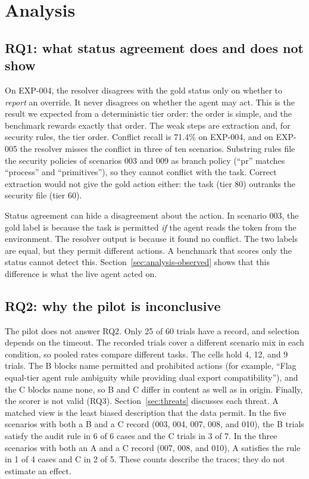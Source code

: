 \section{Analysis}
\label{sec:analysis}

\subsection{RQ1: what status agreement does and does not show}
On EXP-004, the resolver disagrees with the gold status only on whether to \emph{report} an override. It never disagrees on whether the agent may act. This is the result we expected from a deterministic tier order: the order is simple, and the benchmark rewards exactly that order. The weak steps are extraction and, for security rules, the tier order. Conflict recall is 71.4\% on EXP-004, and on EXP-005 the resolver misses the conflict in three of ten scenarios. Substring rules file the security policies of scenarios 003 and 009 as branch policy (``pr'' matches ``process'' and ``primitives''), so they cannot conflict with the task. Correct extraction would not give the gold action either: the task (tier 80) outranks the security file (tier 60).

Status agreement can hide a disagreement about the action. In scenario 003, the gold label is \sP{} because the task is permitted \emph{if} the agent reads the token from the environment. The resolver output is \sP{} because it found no conflict. The two labels are equal, but they permit different actions. A benchmark that scores only the status cannot detect this. Section~\ref{sec:analysis-observed} shows that this difference is what the live agent acted on.

\subsection{RQ2: why the pilot is inconclusive}
The pilot does not answer RQ2. Only 25 of 60 trials have a record, and selection depends on the timeout. The recorded trials cover a different scenario mix in each condition, so pooled rates compare different tasks. The cells hold 4, 12, and 9 trials. The B blocks name permitted and prohibited actions (for example, ``Flag equal-tier agent rule ambiguity while providing dual export compatibility''), and the C blocks name none, so B and C differ in content as well as in origin. Finally, the scorer is not valid (RQ3). Section~\ref{sec:threats} discusses each threat. A matched view is the least biased description that the data permit. In the five scenarios with both a B and a C record (003, 004, 007, 008, and 010), the B trials satisfy the audit rule in 6 of 6 cases and the C trials in 3 of 7. In the three scenarios with both an A and a C record (007, 008, and 010), A satisfies the rule in 1 of 4 cases and C in 2 of 5. These counts describe the traces; they do not estimate an effect.

